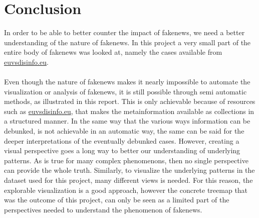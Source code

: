 \documentclass{article}
\begin{document}
\section{Conclusion}
In order to be able to better counter the impact of fakenews, we need a better understanding of the nature of fakenews. In this project a very small part of the entire body of fakenews was looked at, namely the cases available from \href{https://euvsdisinfo.eu}{euvsdisinfo.eu}.
\\\\
Even though the nature of fakenews makes it nearly impossible to automate the visualization or analysis of fakenews, it is still possible through semi automatic methods, as illustrated in this report. This is only achievable because of resources such as \href{https://euvsdisinfo.eu}{euvsdisinfo.eu}, that makes the metainformation available as collections in a structured manner. In the same way that the various ways information can be debunked, is not achievable in an automatic way, the same can be said for the deeper interpretations of the eventually debunked cases. However, creating a visual perspective goes a long way to better our understanding of underlying patterns. As is true for many complex phenomenons, then no single perspective can provide the whole truth. Similarly, to visualize the underlying patterns in the dataset used for this project, many different views is needed. For this reason, the explorable visualization is a good approach, however the concrete treemap that was the outcome of this project, can only be seen as a limited part of the perspectives needed to understand the phenomenon of fakenews.

\newpage


\end{document}

